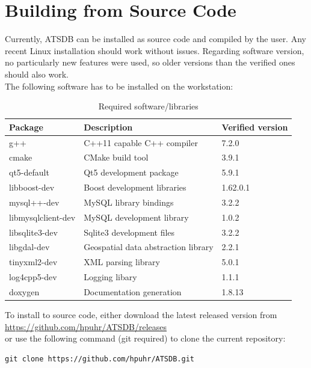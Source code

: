 \documentclass[10pt,letterpaper,extrafontsizes]{memoir}
\begin{document}
\section{Building from Source Code}
Currently, ATSDB can be installed as source code and compiled by the user. Any recent Linux installation should work without issues. Regarding software version, no particularly new features were used, so older versions than the verified ones should also work. \\

The following software has to be installed on the workstation:

\begin{table}[H]
  \center
  \begin{tabular}{ | l | l | l |}
    \hline
    \textbf{Package} & \textbf{Description} & \textbf{Verified version} \\ \hline
    g++ & C++11 capable C++ compiler & 7.2.0 \\ \hline
    cmake & CMake build tool & 3.9.1 \\ \hline
    qt5-default & Qt5 development package & 5.9.1 \\ \hline
    libboost-dev & Boost development libraries & 1.62.0.1 \\ \hline
    mysql++-dev & MySQL library bindings & 3.2.2 \\ \hline
    libmysqlclient-dev & MySQL development library & 1.0.2 \\ \hline
    libsqlite3-dev & Sqlite3 development files & 3.2.2 \\ \hline
    libgdal-dev & Geospatial data abstraction library & 2.2.1 \\ \hline
    tinyxml2-dev & XML parsing library & 5.0.1 \\ \hline
    log4cpp5-dev & Logging libary & 1.1.1 \\ \hline
    doxygen & Documentation generation & 1.8.13 \\ 
    \hline
  \end{tabular}
  \caption{Required software/libraries}
\end{table}

To install to source code, either download the latest released version from \\ \url{https://github.com/hpuhr/ATSDB/releases} \\
or use the following command (git required) to clone the current repository:

\begin{verbatim}
git clone https://github.com/hpuhr/ATSDB.git
\end{verbatim}
\end{document}
